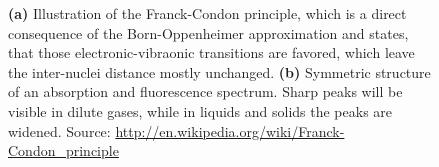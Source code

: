 \documentclass[a4paper]{scrartcl}
\numberwithin{equation}{section}
\numberwithin{figure}{section}
\numberwithin{table}{section}
\begin{document}
\begin{figure}
\centering
{}
\hfill
{}

\caption{ \small \textbf{(a)} Illustration of the Franck-Condon principle, which is a direct consequence of the Born-Oppenheimer approximation and states, that those electronic-vibraonic transitions are favored, which leave the inter-nuclei distance mostly unchanged. \textbf{(b)} Symmetric structure of an absorption and fluorescence spectrum. Sharp peaks will be visible in dilute gases, while in liquids and solids the peaks are widened. \footnotesize Source: \url{http://en.wikipedia.org/wiki/Franck-Condon_principle}}
\label{condon}
\end{figure}
\end{document}
